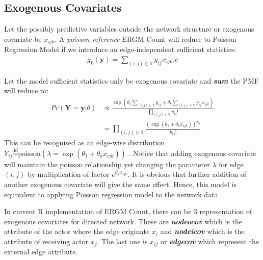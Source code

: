 \documentclass[12pt,a4paper,twoside,openany]{book}\usepackage[]{graphicx}\usepackage[]{color}
\newcommand{\BI}[1]{\textit{\textbf{#1}}}
\begin{document}
\subsection{Exogenous Covariates}
Let the possibly predictive variables outside the network structure or exogenous covariate be $x_{ijk}$.
A \textit{poisson-reference} ERGM Count will reduce to Poisson Regression Model if we introduce an edge-independent sufficient statistics:
\begin{align}
g_k(\bm{y})= \sum_{(i,j) \in \mathbb{Y}} y_{ij}x_{ijk}.c
\end{align}

Let the model sufficient statistics only be exogenous covariate and \BI{sum}  the PMF will reduce to:
\begin{align*}
Pr(\bm{Y}=\bm{y}|\theta) &\propto \frac{\exp\left(\theta_1 \sum_{(i,j) \in \mathbb{Y}} y_{ij} + \theta_k \sum_{(i,j) \in \mathbb{Y}} y_{ij}x_{ijk} \right)}{\prod_{(i,j) \in \mathbb{Y}}y_{ij}!} \\
&= \prod_{(i,j) \in \mathbb{Y}} \frac{(\exp(\theta_1+\theta_k x_{ijk}))^{y_{ij}}}{y_{ij}!}
\end{align*}
This can be recognised as an edge-wise distribution $Y_{ij}\stackrel{\text{iid}}{\sim}\text{poisson}(\lambda =\exp(\theta_1 + \theta_k x_{ijk} ))$ .
Notice that adding exogenous covariate will maintain the poisson relationship yet changing the parameter $\lambda$ for edge $(i,j)$ by multiplication of factor $e^{\theta_k x_{ijk}}$.
It is obvious that further addition of another exogenous covariate will give the same effect.
Hence, this model is equivalent to applying Poisson regression model to the network data.  

In current R implementation of ERGM Count, there can be 3 representation of exogenous covariates for directed network. 
These are \BI{nodeocov} which is the attribute of the actor where the edge originate $x_{i}$ and \BI{nodeicov} which is the attribute of receiving actor $x_j$. 
The last one is $x_{ij}$ or \BI{edgecov} which represent the external edge attribute.
\end{document}
